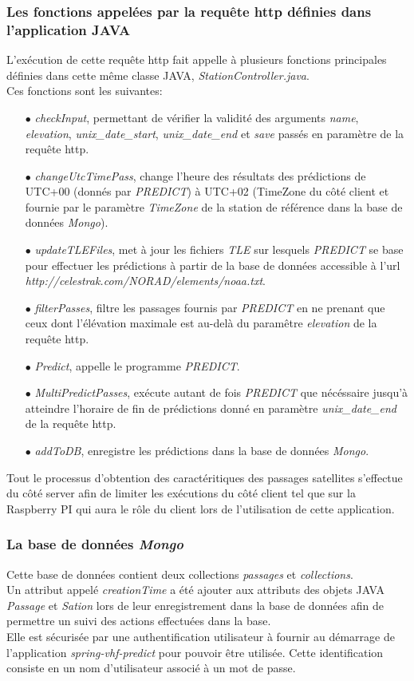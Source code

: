 \documentclass[12pt,fleqn]{book} %
\begin{document}
\subsubsection{Les fonctions appelées par la requête http définies dans l'application JAVA}
\noindent L'exécution de cette requête http fait appelle à plusieurs fonctions principales définies dans cette même classe JAVA, \emph{StationController.java}.
~\\Ces fonctions sont les suivantes:
\begin{itemize}
 \item[$\bullet$] \emph{checkInput}, permettant de vérifier la validité des arguments \emph{name}, \emph{elevation}, \emph{unix\_date\_start}, \emph{unix\_date\_end} et \emph{save} passés en paramètre de la requête http.
 \item[$\bullet$] \emph{changeUtcTimePass}, change l'heure des résultats des prédictions de UTC+00 (donnés par \emph{PREDICT}) à UTC+02 (TimeZone du côté client et fournie par le paramètre \emph{TimeZone} de la station de référence dans la base de données \emph{Mongo}).
 \item[$\bullet$] \emph{updateTLEFiles}, met à jour les fichiers \emph{TLE} sur lesquels \emph{PREDICT} se base pour effectuer les prédictions à partir de la base de données accessible à l'url \emph{http://celestrak.com/NORAD/elements/noaa.txt}.
 \item[$\bullet$] \emph{filterPasses}, filtre les passages fournis par \emph{PREDICT} en ne prenant que ceux dont l'élévation maximale est au-delà du paramêtre \emph{elevation} de la requête http.
 \item[$\bullet$] \emph{Predict}, appelle le programme \emph{PREDICT}.
 \item[$\bullet$] \emph{MultiPredictPasses}, exécute autant de fois \emph{PREDICT} que nécéssaire jusqu'à atteindre l'horaire de fin de prédictions donné en paramètre \emph{unix\_date\_end} de la requête http.
 \item[$\bullet$] \emph{addToDB}, enregistre les prédictions dans la base de données \emph{Mongo}.
 \end{itemize}
Tout le processus d'obtention des caractéritiques des passages satellites s'effectue du côté server afin de limiter les exécutions du côté client tel que sur la Raspberry PI qui aura le rôle du client lors de l'utilisation de cette application.
\subsubsection{La base de données \emph{Mongo}}
\noindent Cette base de données contient deux collections \emph{passages} et \emph{collections}. 
~\\Un attribut appelé \emph{creationTime} a été ajouter aux attributs des objets JAVA \emph{Passage} et \emph{Sation} lors de leur enregistrement dans la base de données afin de permettre un suivi des actions effectuées dans la base. 
~\\Elle est sécurisée par une authentification utilisateur à fournir au démarrage de l'application \emph{spring-vhf-predict} pour pouvoir être utilisée. Cette identification consiste en un nom d'utilisateur associé à un mot de passe. 
\end{document}

